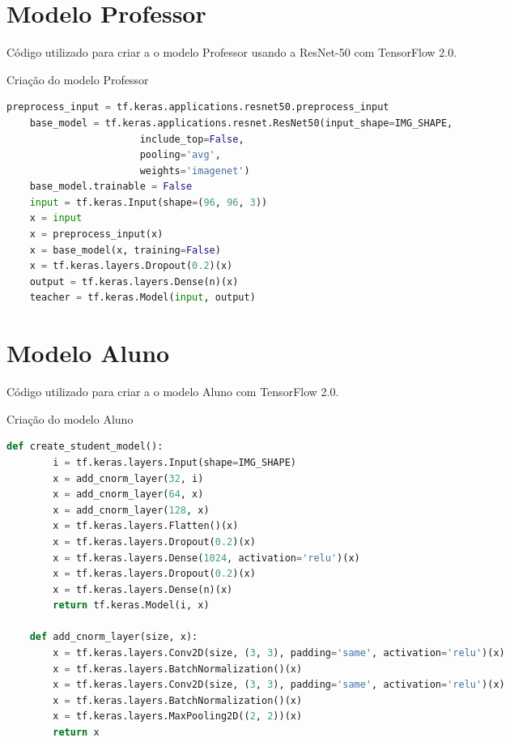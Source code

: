 \begin{apendicesenv}

\partapendices

\chapter{Modelo Professor}\label{apendice_professor}

Código utilizado para criar a o modelo Professor usando a ResNet-50 \cite{resnet} com TensorFlow 2.0.

\begin{codigo}[!htb]
    \caption{Criação do modelo Professor}
    \label{res_professor}
    \begin{lstlisting}[language = python]
	preprocess_input = tf.keras.applications.resnet50.preprocess_input
	base_model = tf.keras.applications.resnet.ResNet50(input_shape=IMG_SHAPE,
					   include_top=False,
					   pooling='avg',
					   weights='imagenet')
	base_model.trainable = False
	input = tf.keras.Input(shape=(96, 96, 3))
	x = input
	x = preprocess_input(x)
	x = base_model(x, training=False)
	x = tf.keras.layers.Dropout(0.2)(x)
	output = tf.keras.layers.Dense(n)(x)
	teacher = tf.keras.Model(input, output)
    \end{lstlisting}
\end{codigo}

\chapter{Modelo Aluno}\label{apendice_aluno}
Código utilizado para criar a o modelo Aluno com TensorFlow 2.0.

\begin{codigo}[!htb]
    \caption{Criação do modelo Aluno}
    \label{res_aluno_1}
    \begin{lstlisting}[language = python]
	def create_student_model():
		i = tf.keras.layers.Input(shape=IMG_SHAPE)
		x = add_cnorm_layer(32, i)
		x = add_cnorm_layer(64, x)
		x = add_cnorm_layer(128, x)
		x = tf.keras.layers.Flatten()(x)
		x = tf.keras.layers.Dropout(0.2)(x)
		x = tf.keras.layers.Dense(1024, activation='relu')(x)
		x = tf.keras.layers.Dropout(0.2)(x)
		x = tf.keras.layers.Dense(n)(x)
		return tf.keras.Model(i, x)

	def add_cnorm_layer(size, x):
		x = tf.keras.layers.Conv2D(size, (3, 3), padding='same', activation='relu')(x)
		x = tf.keras.layers.BatchNormalization()(x)
		x = tf.keras.layers.Conv2D(size, (3, 3), padding='same', activation='relu')(x)
		x = tf.keras.layers.BatchNormalization()(x)
		x = tf.keras.layers.MaxPooling2D((2, 2))(x)
		return x
    \end{lstlisting}
\end{codigo}


\end{apendicesenv}
